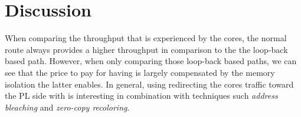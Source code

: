 \section{Discussion}
    When comparing the throughput that is experienced by the cores, the normal route always provides a higher throughput in comparison to the the loop-back based path.
    However, when only comparing those loop-back based paths, we can see that the price to pay for having \schim is largely compensated by the memory isolation the latter enables.
    In general, using redirecting the cores traffic toward the PL side with \schim is interesting in combination with techniques such \textit{address bleaching} and \textit{zero-copy recoloring}.
